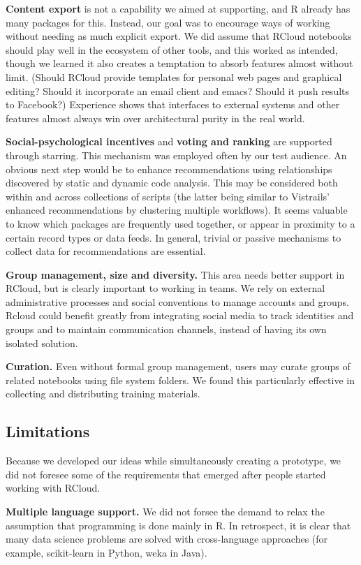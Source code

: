 {\bf Content export} is not a capability we aimed at supporting,
and R already has many packages for this. Instead, our goal was to
encourage ways of working without needing as much explicit export.
We did assume that RCloud notebooks should play well in the ecosystem
of other tools, and this worked as intended, though we learned it also
creates a temptation to absorb features almost without limit. (Should
RCloud provide templates for personal web pages and graphical
editing? Should it incorporate an email client and emacs?
Should it push results to Facebook?) Experience shows that interfaces
to external systems and other features almost always win over architectural
purity in the real world.

{\bf Social-psychological incentives} and {\bf voting and ranking}
are supported through starring. This mechanism was employed often
by our test audience. An obvious next step would be to enhance
recommendations using relationships discovered by static and
dynamic code analysis. This may be considered both within and across
collections of scripts (the latter being similar to Vistrails'
enhanced recommendations by clustering multiple workflows).
It seems valuable to know which packages are frequently used together,
or appear in proximity to a certain record types or data feeds.
In general, trivial or passive mechanisms to collect data for
recommendations are essential.

{\bf Group management, size and diversity.} This area needs better
support in RCloud, but is clearly important to working in teams.
We rely on external administrative processes and social conventions
to manage accounts and groups. Rcloud could benefit greatly from
integrating social media to track identities and groups and to maintain
communication channels, instead of having its own isolated solution.

{\bf Curation.} Even without formal group management, users may
curate groups of related notebooks using file system folders.
We found this particularly effective in collecting and distributing
training materials.

\subsection{Limitations}
Because we developed our ideas while simultaneously creating a prototype,
we did not foresee some of the requirements that emerged after
people started working with RCloud.

{\bf Multiple language support.}
We did not forsee the demand to relax the assumption that programming
is done mainly in R. In retrospect, it is clear that many data science
problems are solved with cross-language approaches (for example, scikit-learn
in Python, weka in Java).


